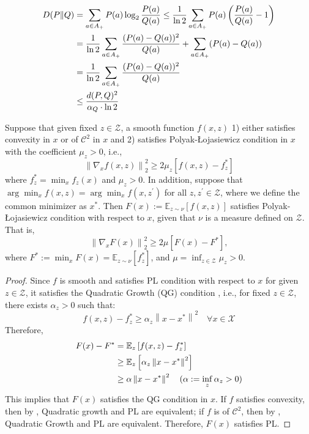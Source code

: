 \begin{lem}\label{lem:RevPinsker}
    \begin{align}
        D(P \| Q)&=\sum_{a \in A_{+}} P(a) \log _2 \frac{P(a)}{Q(a)} \leq \frac{1}{\ln 2} \sum_{a \in A_{+}} P(a)\left(\frac{P(a)}{Q(a)}-1\right) \notag
        \\
        &=\frac{1}{\ln 2}\sum_{a \in A_{+}} \frac{(P(a)-Q(a))^2}{Q(a)}+\sum_{a \in A_{+}}(P(a)-Q(a)) \notag
        \\
        &=\frac{1}{\ln 2} \sum_{a \in A_{+}} \frac{(P(a)-Q(a))^2}{Q(a)} \notag
        \\
        &\leq \frac{d(P, Q)^2}{\alpha_Q \cdot \ln 2} \notag
    \end{align}
\end{lem}

\begin{lem}\label{lem:expDKLalsoPL}  Suppose that given fixed $z\in \mathcal{Z}$, a smooth function $f(x,z)$ 1) either satisfies convexity in $x$ or of $\mathcal{C}^2$ in $x$ and 2) satisfies Polyak-Łojasiewicz condition in $x$ with the coefficient $\mu_z>0$, i.e., $$
\left\|\nabla_x f(x,z)\right\|_2^2 \geq 2 \mu_z\left[f(x,z)-f_z^*\right]
$$
where $f_z^*=\min _x f_z(x)$ and $\mu_z>0$. In addition, suppose that $\arg\min_x f(x,z)=\arg\min_x f(x, z^\prime)$ for all $z, z^\prime \in \mathcal{Z}$, where we define the common minimizer as $x^\ast$. Then $F(x):=\mathbb{E}_{z\sim \nu}[f(x,z)]$ satisfies Polyak-Łojasiewicz condition with respect to $x$, given that $\nu$ is a measure defined on $\mathcal{Z}$. That is, 
$$
\left\|\nabla_x F(x)\right\|_2^2 \geq 2 \mu\left[F(x)-F^*\right],
$$
where $F^*:=\min _x F(x)=\mathbb{E}_{z \sim \nu}\left[f_z^*\right]$, and $\mu=\inf _{z \in \mathcal{Z}} \mu_z>0$.
\end{lem}

\begin{proof}
    Since $f$ is smooth and satisfies PL condition with respect to $x$ for given $z\in\mathcal{Z}$, it satisfies the Quadratic Growth (QG) condition \cite{liao2024error}, i.e., for fixed $z\in\mathcal{Z}$,
    there exists $\alpha_z>0$ such that:
$$
f(x,z)-f_z^\ast \geq \alpha_z\left\|x-x^*\right\|^2 \quad \forall x\in\mathcal{X}
$$
Therefore, 
\begin{align}
    F(x)-F^*&=\mathbb{E}_z\left[f(x, z)-f_z^*\right] \notag
    \\
    &\geq \mathbb{E}_z\left[\alpha_z\left\|x-x^*\right\|^2\right] \notag
    \\
    &\geq \alpha\left\|x-x^*\right\|^2 \quad (\alpha:=\inf _z \alpha_z>0) \notag
\end{align}
This implies that $F(x)$ satisfies the QG condition in $x$. If $f$ satisfies convexity, then by \citet{liao2024error}, Quadratic growth and PL are equivalent; if $f$ is of $\mathcal{C}^2$, then by \citet{rebjock2023fast}, Quadratic Growth and PL are equivalent. Therefore, $F(x)$ satisfies PL.
\end{proof}



